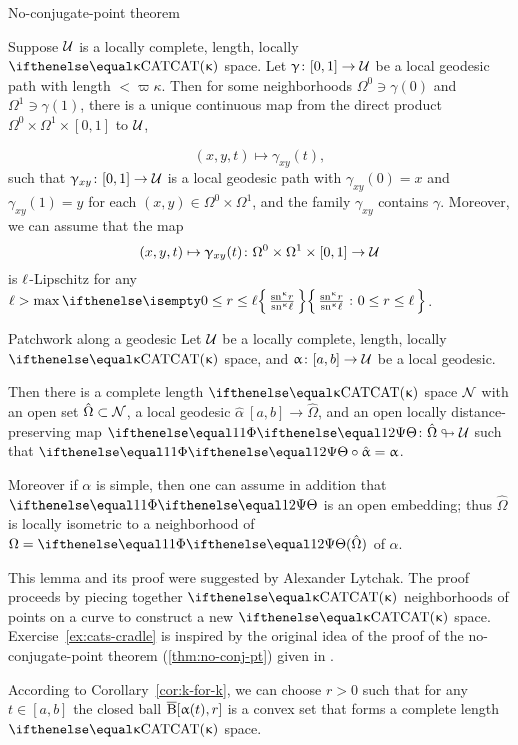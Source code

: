 \begin{thm}{No-conjugate-point theorem}
\label{thm:no-conj-pt}{\sloppy 
Suppose $\mathcal{U}$ is a locally complete, length, locally $\CAT\kappa$ space.
Let $\gamma\:[0,1]\to\spc{U}$ be a local geodesic path with length $<\varpi\kappa$.
Then for some neighborhoods $\Omega^0\ni \gamma(0)$ and $\Omega^1\ni\gamma(1)$, 
there is a unique continuous map from the direct product $\Omega^0\times \Omega^1\times[0,1]$ to $\mathcal{U}$, 

\[(x,y,t)\mapsto\gamma_{x y}(t),\]  
such that 
$\gamma_{x y}\:[0,1]\to\spc{U}$ is a local geodesic path with 
$\gamma_{x y}(0)=x$ and 
$\gamma_{x y}(1)=y$ for each $(x,y)\in\Omega^0\times\Omega^1$,
and the family $\gamma_{x y}$ contains $\gamma$.
Moreover, we can assume that the map 
\[(x,y,t)\mapsto\gamma_{x y}(t)\:\Omega^0\times\Omega^1\times[0,1]\to\spc{U}\] 
is ${\ell}$-Lipschitz
for any
$\Lip>\max\set{\tfrac{\sn\kappa r}{\sn\kappa \ell}}{0\le r\le \ell}$.

}
\end{thm}

{\sloppy

\begin{thm}{Patchwork along a geodesic}
\label{lem:patch}
Let $\mathcal{U}$ be a locally complete, length, locally $\CAT\kappa$ space, 
and $\alpha\:[a,b]\to\spc{U}$ be a local geodesic.

Then there is a complete length $\CAT\kappa$ space $\mathcal{N}$
with an open set $\hat\Omega\subset \spc{N}$,
a local geodesic $\hat\alpha\:[a,b]\to\hat\Omega$,
and an open locally distance-preserving map 
$\map\:\hat\Omega\looparrowright\spc{U}$ such that
$\map\circ\hat\alpha=\alpha$.

Moreover if $\alpha$ is simple, then one can assume in addition that $\map$ is an open embedding;
thus $\hat\Omega$ is locally isometric to a neighborhood of $\Omega=\map(\hat\Omega)$ of $\alpha$.
\end{thm}

}

This lemma and its proof were suggested by Alexander Lytchak.
The proof proceeds by piecing together $\CAT{\kappa}$  neighborhoods of points on a curve to construct a new $\CAT{\kappa}$ space.  
Exercise~\ref{ex:cats-cradle} is inspired by the original idea of the proof of the no-conjugate-point theorem (\ref{thm:no-conj-pt}) given in \cite{alexander-bishop:h-c}.

According to Corollary~\ref{cor:k-for-k},
we can choose $r>0$ such that 
for any $t\in[a,b]$ the closed ball
$\overline{\mathrm{B}}{}[\upalpha(t),r]$ is a convex set that forms a complete length $\CAT\kappa$ space.

